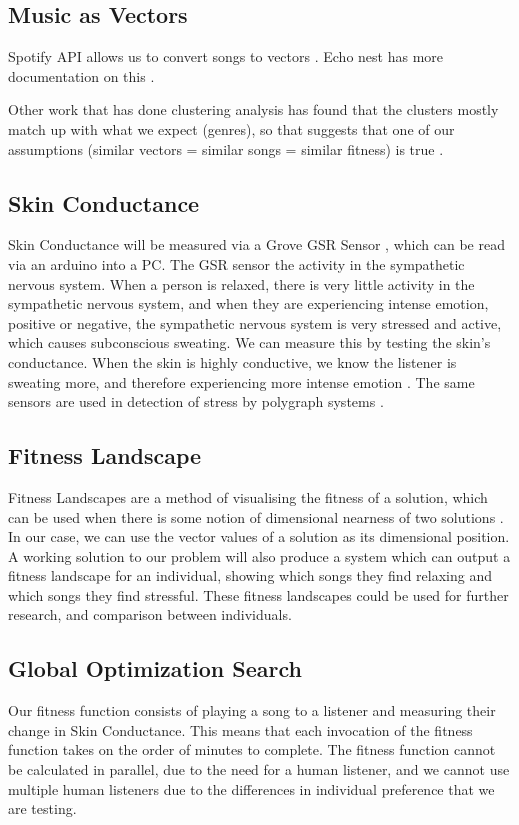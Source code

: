 \documentclass{article}
\begin{document}
	\subsection{Music as Vectors}
	Spotify API allows us to convert songs to vectors \cite{spotify_get_nodate}. Echo nest has more documentation on this \cite{jehan_analyzer_nodate}.
	
	Other work that has done clustering analysis has found that the clusters mostly match up with what we expect (genres), so that suggests that one of our assumptions (similar vectors = similar songs = similar fitness) is true \cite{santos_discovering_2017, noauthor_coachellar_nodate}.
	
	\subsection{Skin Conductance}
	Skin Conductance will be measured via a Grove GSR Sensor \cite{seeedstudio_grove_nodate}, which can be read via an arduino into a PC. The GSR sensor the activity in the sympathetic nervous system. When a person is relaxed, there is very little activity in the sympathetic nervous system, and when they are experiencing intense emotion, positive or negative, the sympathetic nervous system is very stressed and active, which causes subconscious sweating. We can measure this by testing the skin's conductance. When the skin is highly conductive, we know the listener is sweating more, and therefore experiencing more intense emotion \cite{farnsworth_what_2018}. The same sensors are used in detection of stress by polygraph systems \cite{tuckett_detection_1986}.
	
	\subsection{Fitness Landscape}
	Fitness Landscapes are a method of visualising the fitness of a solution, which can be used when there is some notion of dimensional nearness of two solutions \cite{reidys_combinatorial_2002}. In our case, we can use the vector values of a solution as its dimensional position. A working solution to our problem will also produce a system which can output a fitness landscape for an individual, showing which songs they find relaxing and which songs they find stressful. These fitness landscapes could be used for further research, and comparison between individuals.
	
	\subsection{Global Optimization Search}
	Our fitness function consists of playing a song to a listener and measuring their change in Skin Conductance. This means that each invocation of the fitness function takes on the order of minutes to complete. The fitness function cannot be calculated in parallel, due to the need for a human listener, and we cannot use multiple human listeners due to the differences in individual preference that we are testing.
	
\end{document}
